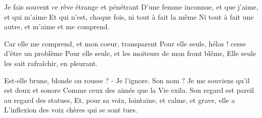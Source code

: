\documentclass{article}
\begin{document}
  \begin{poem}
  
    \begin{stanza}
      Je fais souvent ce rêve étrange et pénétrant\verseline
      D'une femme inconnue, et que j'aime, et qui m'aime\verseline
      Et qui n'est, chaque fois, ni tout à fait la même\verseline
      Ni tout à fait une autre, et m'aime et me comprend.
    \end{stanza}
    
    \begin{stanza}
      Car elle me comprend, et mon coeur, transparent\verseline
      Pour elle seule, hélas ! cesse d'être un problème\verseline
      Pour elle seule, et les moiteurs de mon front blême,\verseline
      Elle seule les sait rafraîchir, en pleurant.
    \end{stanza}
    
    \begin{stanza}
      Est-elle brune, blonde ou rousse ? - Je l'ignore.\verseline
      Son nom ? Je me souviens qu'il est doux et sonore\verseline
      Comme ceux des aimés que la Vie exila.\verseline
      Son regard est pareil au regard des statues,\verseline
      Et, pour sa voix, lointaine, et calme, et grave, elle a\verseline
      L'inflexion des voix chères qui se sont tues.
    \end{stanza}
    
  \end{poem}
\end{document}
